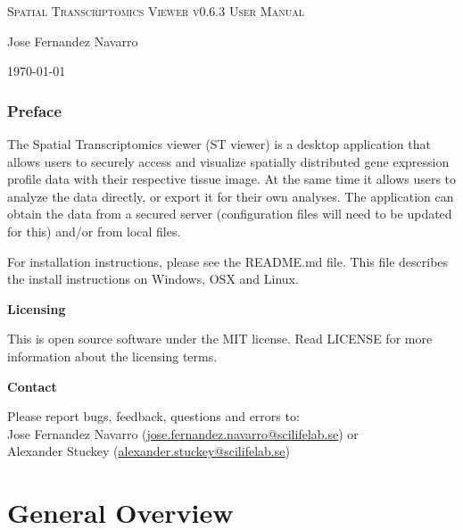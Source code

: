 \documentclass[10pt,a4paper,titlepage]{book}
\begin{document}
\begin{titlepage}
	\centering
	{\scshape\LARGE Spatial Transcriptomics Viewer v0.6.3 User Manual\par}
	\vspace{1cm}
	{\Large Jose Fernandez Navarro\par}
	\vspace{1cm}
	{\today\par}

\end{titlepage}


\subsection*{Preface}
The Spatial Transcriptomics viewer (ST viewer) is a desktop application that allows users to securely access and visualize spatially distributed gene expression profile data with their respective tissue image. At the same time it allows users to analyze the data directly, or export it for their own analyses. The application can obtain the data from a secured server (configuration files will need to be updated for this) and/or from local files.


For installation instructions, please see the README.md file. This file describes the install instructions on Windows, OSX and Linux.

{\textbf{Licensing}}

This is open source software under the MIT license.
Read LICENSE for more information about the licensing terms.

{\textbf{Contact}}

Please report bugs, feedback, questions and errors to:\\
Jose Fernandez Navarro (\href{mailto:jose.fernandez.navarro@scilifelab.se}{jose.fernandez.navarro@scilifelab.se}) or\\
Alexander Stuckey (\href{mailto:alexander.stuckey@scilifelab.se}{alexander.stuckey@scilifelab.se})



\tableofcontents
\raggedbottom
\clearpage
\listoffigures
{}

\chapter{General Overview}
\end{document}
